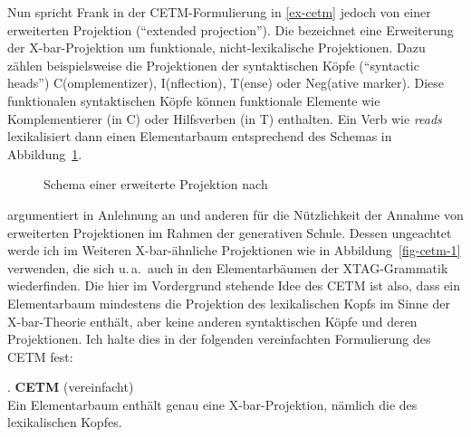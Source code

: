 Nun spricht Frank in der CETM-Formulierung in \ref{ex-cetm} jedoch von einer erweiterten Projektion ("`extended projection"'). Die  \citep{Grimshaw:91,Grimshaw:00}  bezeichnet eine Erweiterung der X-bar-Projektion um funktionale, nicht-lexikalische Projektionen. Dazu zählen beispielsweise die Projektionen der syntaktischen Köpfe ("`syntactic heads"') C(omplemen\-tizer), I(nflection), T(ense) oder Neg(ative marker). Diese funktionalen syntaktischen Köpfe können funktionale Elemente wie Komplementierer (in C) oder Hilfsverben (in T) enthalten. Ein Verb wie {\it reads} lexikalisiert dann einen Elementarbaum entsprechend des Schemas in Abbildung~\ref{fig-cetm-2}.
\begin{figure}[p]
\centering
{}
\caption{\label{fig-cetm-2}Schema einer erweiterte Projektion nach \citet[25]{Frank:02}}
\end{figure}
\citet[45ff]{Frank:02} argumentiert in Anlehnung an \cite{Grimshaw:91} und anderen für die Nützlichkeit der Annahme von erweiterten Projektionen im Rahmen der generativen Schule. Dessen ungeachtet werde ich im Weiteren X-bar-ähnliche Projektionen wie in Abbildung~\ref{fig-cetm-1} verwenden, die sich u.\,a.\ auch in den Elementarbäumen der XTAG-Grammatik wiederfinden. Die hier im Vordergrund stehende Idee des CETM ist also, dass ein Elementarbaum mindestens die Projektion des lexikalischen Kopfs im Sinne der X-bar-Theorie enthält, aber keine anderen syntaktischen Köpfe und deren Projektionen. Ich halte dies in der folgenden vereinfachten Formulierung des CETM fest: 
 
\ex. \label{ex-cetm-vereinfacht} {\bf CETM} (vereinfacht) \\
Ein Elementarbaum enthält genau eine X-bar-Projektion, nämlich die des lexikalischen Kopfes.


